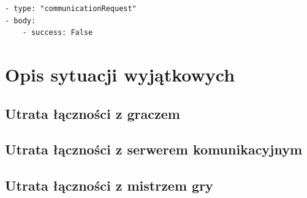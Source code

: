 \documentclass[a4paper]{article}
\begin{document}
\begin{verbatim}
- type: "communicationRequest"
- body:
    - success: False
\end{verbatim}

\section{Opis sytuacji wyjątkowych}

\subsection{Utrata łączności z graczem}

\subsection{Utrata łączności z serwerem komunikacyjnym}

\subsection{Utrata łączności z mistrzem gry}
\end{document}
